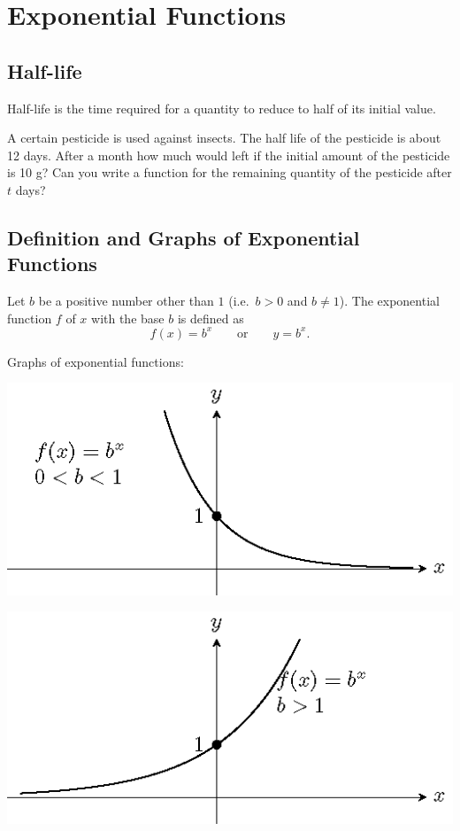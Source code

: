 
\section{Exponential Functions}

\subsection{Half-life}

Half-life is the time required for a quantity to reduce to half of its
initial value.

A certain pesticide is used against insects. The half life of the
pesticide is about 12 days. After a month how much would left if the
initial amount of the pesticide is 10 g? Can you write a function for
the remaining quantity of the pesticide after \(t\) days?

\subsection{Definition and Graphs of Exponential Functions}

Let \(b\) be a positive number other than \(1\) (i.e.~\(b>0\) and
\(b\neq 1\)). The exponential function \(f\) of \(x\) with the base
\(b\) is defined as \[
f(x)=b^x\quad\quad\text{or}\quad\quad y=b^x.
\]

Graphs of exponential functions:

\begin{multicols}{2}
  \includegraphics[scale=0.8]{figs/tikz-example-exp-function-1.png}
  
  \columnbreak

  \includegraphics[scale=0.8]{figs/tikz-example-exp-function-2.png}
\end{multicols}


